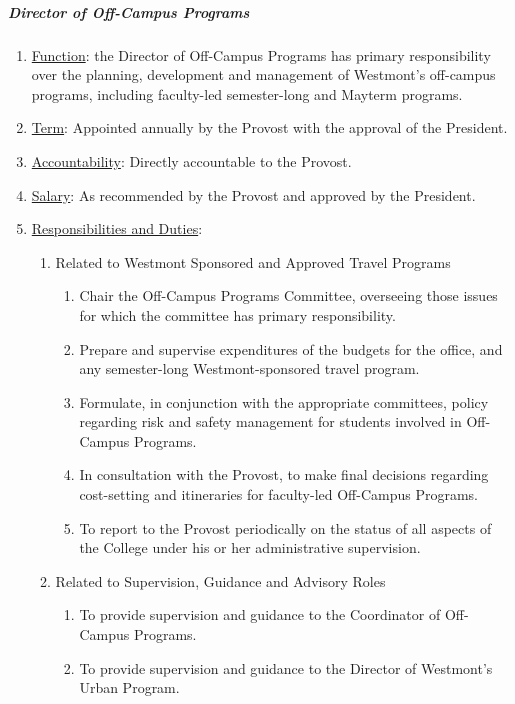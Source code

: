 				\subparagraph{Director of Off-Campus Programs}
					\begin{enumerate}
						\item{\underline{Function}:  the Director of Off-Campus Programs has primary responsibility over the planning, development and management of Westmont's off-campus programs, including faculty-led semester-long and Mayterm programs.}
						\item{\underline{Term}:  Appointed annually by the Provost with the approval of the President.}
						\item{\underline{Accountability}:  Directly accountable to the Provost.}
						\item{\underline{Salary}:  As recommended by the Provost and approved by the President.}
						\item{\underline{Responsibilities and Duties}:
							\begin{enumerate}
								\item{Related to Westmont Sponsored and Approved Travel Programs
									\begin{enumerate}
										\item{Chair the Off-Campus Programs Committee, overseeing those issues for which the committee has primary responsibility.}
										\item{Prepare and supervise expenditures of the budgets for the office, and any semester-long Westmont-sponsored travel program.}
										\item{Formulate, in conjunction with the appropriate committees, policy regarding risk and safety management for students involved in Off-Campus Programs.}
										\item{In consultation with the Provost, to make final decisions regarding cost-setting and itineraries for faculty-led Off-Campus Programs.}
										\item{To report to the Provost periodically on the status of all aspects of the College under his or her administrative supervision.}
									\end{enumerate}
								}
								\item{ Related to Supervision, Guidance and Advisory Roles
									\begin{enumerate}
										\item{To provide supervision and guidance to the Coordinator of Off-Campus Programs.}
										\item{To provide supervision and guidance to the Director of Westmont's Urban Program.}
									\end{enumerate}
								}
							\end{enumerate}
						}
					\end{enumerate}
